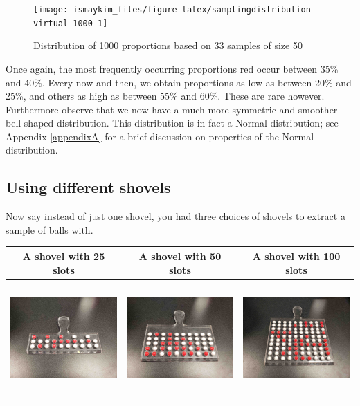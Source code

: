\documentclass[12pt, krantz2,]{krantz}
\begin{document}
\begin{figure}

{\centering \texttt{[image: ismaykim\_files/figure-latex/samplingdistribution-virtual-1000-1]} 

}

\caption{Distribution of 1000 proportions based on 33 samples of size 50}\label{fig:samplingdistribution-virtual-1000}
\end{figure}

Once again, the most frequently occurring proportions red occur between 35\% and 40\%. Every now and then, we obtain proportions as low as between 20\% and 25\%, and others as high as between 55\% and 60\%. These are rare however. Furthermore observe that we now have a much more symmetric and smoother bell-shaped distribution. This distribution is in fact a Normal distribution; see Appendix \ref{appendixA} for a brief discussion on properties of the Normal distribution.

\hypertarget{using-different-shovels}{%
\subsection{Using different shovels}\label{using-different-shovels}}

Now say instead of just one shovel, you had three choices of shovels to extract a sample of balls with.

\begin{longtable}[]{@{}ccc@{}}
\toprule
A shovel with 25 slots & A shovel with 50 slots & A shovel with 100 slots\tabularnewline
\midrule
\endhead
\includegraphics[width=\textwidth,height=1.7in]{images/sampling/shovel_025.jpg} & \includegraphics[width=\textwidth,height=1.7in]{images/sampling/shovel_050.jpg} & \includegraphics[width=\textwidth,height=1.7in]{images/sampling/shovel_100.jpg}\tabularnewline
\bottomrule
\end{longtable}
\end{document}
